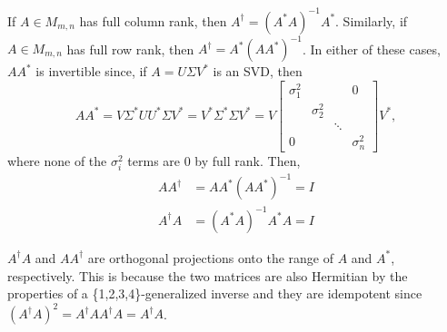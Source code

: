\begin{note*}
If $A \in M_{m,n}$ has full column rank, then $A^\dag = (A^*A)^{-1}A^*$. Similarly, if $A \in M_{m,n}$ has full row rank, then $A^\dag = A^*(AA^*)^{-1}$. In either of these cases, $AA^*$ is invertible since, if $A = U\Sigma V^*$ is an SVD, then 
$$
AA^* = V\Sigma^* U U^* \Sigma V^* = V^* \Sigma^*\Sigma V^* = V\begin{bmatrix}\sigma_1^2 & & & 0 \\ & \sigma_2^2 & & \\ & & \ddots & \\ 0 & & & \sigma_n^2\end{bmatrix}V^*,
$$
where none of the $\sigma_i^2$ terms are 0 by full rank. Then,
\begin{align*}
    AA^\dag &= AA^*(AA^*)^{-1} = I \\
    A^\dag A &= (A^*A)^{-1}A^*A = I
\end{align*}
\end{note*}

\begin{note*}
$A^\dag A$ and $AA^\dag$ are orthogonal projections onto the range of $A$ and $A^*$, respectively. This is because the two matrices are also Hermitian by the properties of a \{1,2,3,4\}-generalized inverse and they are idempotent since $(A^\dag A)^2 = A^\dag A A^\dag A = A^\dag A$.
\end{note*}
